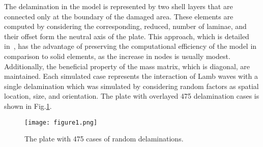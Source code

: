 \documentclass[runningheads]{llncs}
\begin{document}
The delamination in the model is represented by two shell layers that are connected only at the boundary of the damaged area. 
These elements are computed by considering the corresponding, reduced, number of laminae, and their offset form the neutral axis of the plate. 
This approach, which is detailed in~\cite{Kudela2009}, has the advantage of preserving the computational efficiency of the model in comparison to solid elements, as the increase in nodes is usually modest. 
Additionally, the beneficial property of the mass matrix, which is diagonal, are maintained. 
Each simulated case represents the interaction of Lamb waves with a single   delamination which was simulated by considering random factors as spatial location, size, and orientation.
The plate with overlayed 475 delamination cases is shown in Fig.\ref{fig:rand_delaminations}. 
\begin{figure} [h!]
	\begin{center}
		\texttt{[image: figure1.png]}
	\end{center}
	\caption{The plate with 475 cases of random delaminations.} 
	\label{fig:rand_delaminations}
\end{figure}
\end{document}
